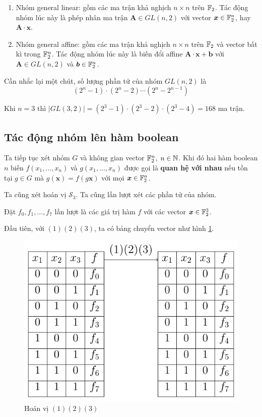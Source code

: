 \begin{enumerate}
    \item Nhóm general linear: gồm các ma trận khả nghịch $n \times n$ trên $\mathbb{F}_2$. Tác động nhóm lúc này là phép nhân ma trận $\bm{A} \in GL(n, 2)$ với vector $\bm{x} \in \mathbb{F}_2^n$, hay $\bm{A} \cdot \bm{x}$.
    \item Nhóm general affine: gồm các ma trận khả nghịch $n \times n$ trên $\mathbb{F}_2$ và vector bất kì trong $\mathbb{F}_2^n$. Tác động nhóm lúc này là biến đổi affine $\bm{A} \cdot \bm{x} + \bm{b}$ với $\bm{A} \in GL(n, 2)$ và $\bm{b} \in \mathbb{F}_2^n$.
\end{enumerate}

Cần nhắc lại một chút, số lượng phần tử của nhóm $GL(n, 2)$ là \[ (2^n - 1) \cdot (2^n - 2) \cdots (2^n - 2^{n-1}) \]

Khi $n = 3$ thì $\lvert GL(3, 2) \rvert = (2^3 - 1) \cdot (2^3 - 2) \cdot (2^3 - 4) = 168$ ma trận.

\subsection*{Tác động nhóm lên hàm boolean}

Ta tiếp tục xét nhóm $G$ và không gian vector $\mathbb{F}_2^n$, $n \in \mathbb{N}$. Khi đó hai hàm boolean $n$ biến $f(x_1, \ldots, x_n)$ và $g(x_1, \ldots, x_n)$ được gọi là \textbf{quan hệ với nhau} nếu tồn tại $g \in G$ mà $g(\bm{x}) = f(g \bm{x})$ với mọi $\bm{x} \in \mathbb{F}_2^n$.

Ta cũng xét hoán vị $\mathcal{S}_3$. Ta cũng lần lượt xét các phần tử của nhóm.

Đặt $f_0, f_1, \ldots, f_7$ lần lượt là các giá trị hàm $f$ với các vector $\bm{x} \in \mathbb{F}_2^3$.

Đầu tiên, với $(1)(2)(3)$, ta có bảng chuyển vector như hình \ref{burnside:first}.

\begin{figure}[ht]
    \centering
    \includegraphics[page=1]{figures/burnside.pdf}
    \caption{Hoán vị $(1)(2)(3)$}
    \label{burnside:first}
\end{figure}

